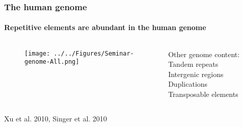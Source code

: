 \documentclass{beamer}
\begin{document}
		\begin{frame} %
			
			\frametitle{The human genome}
			\framesubtitle{Repetitive elements are abundant in the human genome}
			
			\begin{columns}
				\begin{column}{0.6\linewidth}
					
					\begin{figure}
						\texttt{[image: ../../Figures/Seminar-genome-All.png]}			
					\end{figure}
				\end{column}
			
				\begin{column}{0.4\linewidth}
					\begin{block}{Other genome content:}
						Tandem repeats\\
						Intergenic regions\\
						Duplications\\
						Transposable elements
					\end{block}
				\end{column}
			\end{columns}
	
			
			Xu et al. 2010, Singer et al. 2010

		\end{frame}
		
\end{document}
